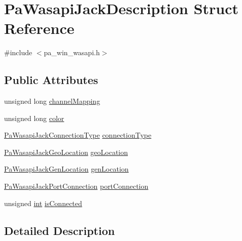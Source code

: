 \hypertarget{struct_pa_wasapi_jack_description}{}\section{Pa\+Wasapi\+Jack\+Description Struct Reference}
\label{struct_pa_wasapi_jack_description}


{\ttfamily \#include $<$pa\+\_\+win\+\_\+wasapi.\+h$>$}

\subsection*{Public Attributes}
\begin{DoxyCompactItemize}
\item 
unsigned long \hyperlink{struct_pa_wasapi_jack_description_afc8865aab64ab827315a7ce645b627f4}{channel\+Mapping}
\item 
unsigned long \hyperlink{struct_pa_wasapi_jack_description_a2a0d9cd5e745192482afeda572941d15}{color}
\item 
\hyperlink{pa__win__wasapi_8h_a40b6ae7a53886196c59afe8b704695e1}{Pa\+Wasapi\+Jack\+Connection\+Type} \hyperlink{struct_pa_wasapi_jack_description_ae9fd6f09268cc8d3c510965305025a7e}{connection\+Type}
\item 
\hyperlink{pa__win__wasapi_8h_ae869986af2827bbd6257bca43d9a8188}{Pa\+Wasapi\+Jack\+Geo\+Location} \hyperlink{struct_pa_wasapi_jack_description_aed082cc704160dc568aec7da9b778328}{geo\+Location}
\item 
\hyperlink{pa__win__wasapi_8h_ac205e0ea20ca795edcfd9f19135cf4cf}{Pa\+Wasapi\+Jack\+Gen\+Location} \hyperlink{struct_pa_wasapi_jack_description_a852b2bcb200801d995b4b250bb0bad6c}{gen\+Location}
\item 
\hyperlink{pa__win__wasapi_8h_aa4c63b1465e5de66f108facd3ddf893d}{Pa\+Wasapi\+Jack\+Port\+Connection} \hyperlink{struct_pa_wasapi_jack_description_a5c78feaba82b02de3997a698231b5f05}{port\+Connection}
\item 
unsigned \hyperlink{xmltok_8h_a5a0d4a5641ce434f1d23533f2b2e6653}{int} \hyperlink{struct_pa_wasapi_jack_description_a76f80f4664be933cc4d760b37d1ff410}{is\+Connected}
\end{DoxyCompactItemize}


\subsection{Detailed Description}


